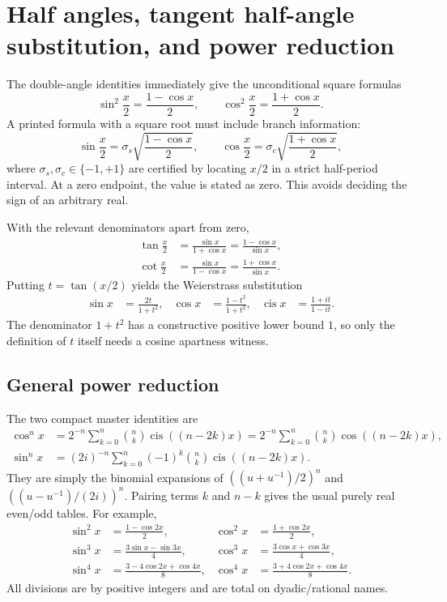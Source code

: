 \documentclass[11pt]{article}
\theoremstyle{definition}
\newcommand{\cis}{\operatorname{cis}}
\begin{document}
\section{Half angles, tangent half-angle substitution, and power reduction}
\label{sec:half-power}

The double-angle identities immediately give the unconditional square formulas
\[
 \sin^2\frac x2=\frac{1-\cos x}{2},\qquad
 \cos^2\frac x2=\frac{1+\cos x}{2}.
 \tag{8.1}
\]
A printed formula with a square root must include branch information:
\[
 \sin\frac x2=\sigma_s\sqrt{\frac{1-\cos x}{2}},\qquad
 \cos\frac x2=\sigma_c\sqrt{\frac{1+\cos x}{2}},
 \tag{8.2}
\]
where \(\sigma_s,\sigma_c\in\{-1,+1\}\) are certified by locating \(x/2\) in a
strict half-period interval.  At a zero endpoint, the value is stated as zero.
This avoids deciding the sign of an arbitrary real.

With the relevant denominators apart from zero,
\begin{align}
 \tan\frac x2&=\frac{\sin x}{1+\cos x}
 =\frac{1-\cos x}{\sin x},\tag{8.3}\\
 \cot\frac x2&=\frac{\sin x}{1-\cos x}
 =\frac{1+\cos x}{\sin x}.\tag{8.4}
\end{align}
Putting \(t=\tan(x/2)\) yields the Weierstrass substitution
\begin{align}
 \sin x&=\frac{2t}{1+t^2},&
 \cos x&=\frac{1-t^2}{1+t^2},&
 \cis x&=\frac{1+it}{1-it}.
 \tag{8.5}
\end{align}
The denominator \(1+t^2\) has a constructive positive lower bound \(1\), so
only the definition of \(t\) itself needs a cosine apartness witness.

\subsection{General power reduction}

The two compact master identities are
\begin{align}
 \cos^n x
 &=2^{-n}\sum_{k=0}^n\binom nk\cis((n-2k)x)
 =2^{-n}\sum_{k=0}^n\binom nk\cos((n-2k)x),\tag{8.6}\\
 \sin^n x
 &=(2i)^{-n}\sum_{k=0}^n(-1)^k\binom nk\cis((n-2k)x).
 \tag{8.7}
\end{align}
They are simply the binomial expansions of
\(((u+u^{-1})/2)^n\) and \(((u-u^{-1})/(2i))^n\).  Pairing terms \(k\) and
\(n-k\) gives the usual purely real even/odd tables.  For example,
\begin{align*}
 \sin^2x&=\frac{1-\cos2x}{2},&
 \cos^2x&=\frac{1+\cos2x}{2},\\
 \sin^3x&=\frac{3\sin x-\sin3x}{4},&
 \cos^3x&=\frac{3\cos x+\cos3x}{4},\\
 \sin^4x&=\frac{3-4\cos2x+\cos4x}{8},&
 \cos^4x&=\frac{3+4\cos2x+\cos4x}{8}.
\end{align*}
All divisions are by positive integers and are total on dyadic/rational names.
\end{document}
